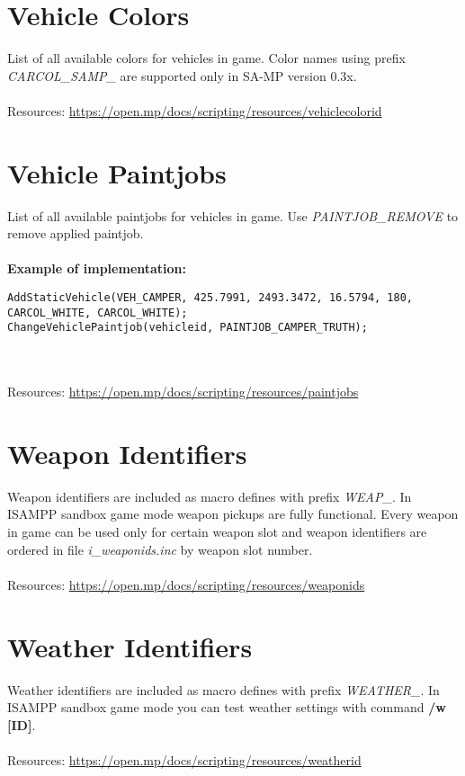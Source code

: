 \documentclass{article}
\begin{document}
\section{Vehicle Colors}
List of all available colors for vehicles in game. Color names using prefix \textit{CARCOL\_SAMP\_} are supported only in SA-MP version 0.3x.
\\
\\Resources: \url{https://open.mp/docs/scripting/resources/vehiclecolorid}


\section{Vehicle Paintjobs}
List of all available paintjobs for vehicles in game. Use \textit{PAINTJOB\_REMOVE} to remove applied paintjob.
\\
\\
\textbf{Example of implementation:}
\begin{verbatim}
AddStaticVehicle(VEH_CAMPER, 425.7991, 2493.3472, 16.5794, 180, CARCOL_WHITE, CARCOL_WHITE);
ChangeVehiclePaintjob(vehicleid, PAINTJOB_CAMPER_TRUTH);
\end{verbatim}
\\
\\Resources: \url{https://open.mp/docs/scripting/resources/paintjobs}


\section{Weapon Identifiers}
Weapon identifiers are included as macro defines with prefix \textit{WEAP\_}. In ISAMPP sandbox game mode weapon pickups are fully functional. Every weapon in game can be used only for certain weapon slot and weapon identifiers are ordered in file \textit{i\_weaponids.inc} by weapon slot number.
\\
\\Resources: \url{https://open.mp/docs/scripting/resources/weaponids}


\section{Weather Identifiers}
Weather identifiers are included as macro defines with prefix \textit{WEATHER\_}. In ISAMPP sandbox game mode you can test weather settings with command \textbf{/w [ID]}.
\\
\\Resources: \url{https://open.mp/docs/scripting/resources/weatherid}
\end{document}
